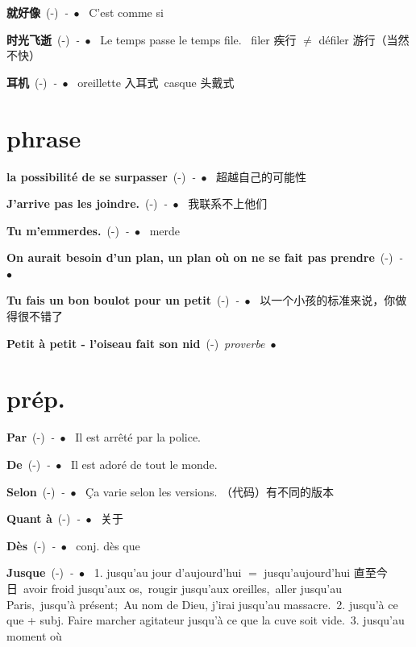 \documentclass[10pt,a4paper,twoside]{article} %
\newcommand{\entry}[4]{\textbf{#1}\ {(#2)}\ \textit{#3}\ $\bullet$\ {#4}} %
\begin{document}
\begin{CJK*}{UTF8}{gkai}
\begin{multicols}{2}
\entry{就好像}{-}{-}
{
C'est comme si 
}

\entry{时光飞逝}{-}{-}
{
Le temps passe le temps file. \ 
filer 疾行 $\neq$ défiler 游行（当然不快） 
}

\entry{耳机}{-}{-}
{
oreillette 入耳式\ 
casque     头戴式 
}

\end{multicols}



\section*{phrase}

\begin{multicols}{2}

\entry{la possibilité de se surpasser}{-}{-}
{
超越自己的可能性
}

\entry{J'arrive pas les joindre.}{-}{-}
{
我联系不上他们
}

\entry{Tu m'emmerdes.}{-}{-}
{
merde
}

\entry{On aurait besoin d'un plan, un plan o\`u on ne se fait pas prendre}{-}{-}
{
}

\entry{Tu fais un bon boulot pour un petit}{-}{-}
{
以一个小孩的标准来说，你做得很不错了
}

\entry{Petit à petit - l'oiseau fait son nid}{-}{proverbe}
{
}

\end{multicols}


\section*{prép.}

\begin{multicols}{2}

\entry{Par}{-}{-}
{
Il est arrêté par la police.
}

\entry{De}{-}{-}
{
Il est adoré de tout le monde.
}

\entry{Selon}{-}{-}
{
Ça varie selon les versions. （代码）有不同的版本
}

\entry{Quant à}{-}{-}
{
关于
}

\entry{Dès}{-}{-}
{
conj. dès que 
}

\entry{Jusque}{-}{-}
{
1. jusqu'au jour d'aujourd'hui $=$ jusqu'aujourd'hui 直至今日\ 
avoir froid jusqu'aux os,\ rougir jusqu'aux oreilles,\ aller jusqu'au Paris,\ jusqu'à présent;\
Au nom de Dieu, j'irai jusqu'au massacre.\ 
2. jusqu'à ce que + subj. Faire marcher agitateur jusqu'à ce que la cuve soit vide.\ 
3. jusqu'au moment o\`u
}

\end{multicols}

\end{CJK*}
\end{document}
